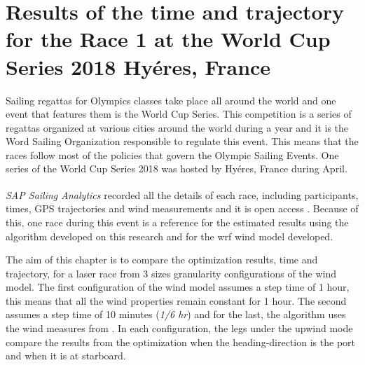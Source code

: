 \chapter{%
Results of the time and trajectory for the Race 1 at the World Cup Series 2018 Hyéres, France} \label{sec:simulations}

Sailing regattas for Olympics classes take place all around the world and one event that features them is the World Cup Series. This competition is a series of regattas organized at various cities around the world during a year and it is the Word Sailing Organization  responsible to regulate this event. This means that the races follow most of the policies that govern the Olympic Sailing Events.
One series of the World Cup Series 2018 was hosted by Hyéres, France during April. \par \noindent
\textit{SAP Sailing Analytics}\textsuperscript{\textregistered} recorded all the details of each race, including participants, times, GPS trajectories and wind measurements and it is open access \cite{SAPsailingana}. Because of this, one race during this event is a reference for the estimated results using the algorithm developed on this research and for the \acrshort{wrf} wind model developed.  \par 

The aim of this chapter is to compare the optimization results, time and trajectory, for a laser race from 3 sizes granularity configurations of the wind model.
The first configuration of the wind model assumes a step time of 1 hour, this means that all the wind properties remain constant for 1 hour. The second assumes a step time of 10 minutes (\textit{1/6 hr}) and for the last, the algorithm uses the wind measures from \cite{SAPsailingana}. In each configuration, the legs under the upwind mode compare the results from the optimization when the heading-direction is the port and when it is at starboard. \par 

